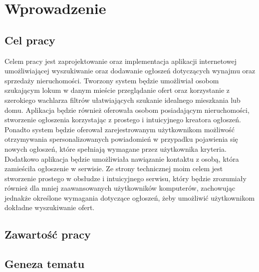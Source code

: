 \chapter{Wprowadzenie}
\label{cha:wprowadzenie}


\section{Cel pracy}
\label{sec:celPracy}
Celem pracy jest zaprojektowanie oraz implementacja aplikacji internetowej umożliwiającej wyszukiwanie oraz dodawanie ogłoszeń dotyczących wynajmu oraz sprzedaży nieruchomości. Tworzony system będzie umożliwiał osobom szukającym lokum w danym mieście przeglądanie ofert oraz korzystanie z szerokiego wachlarza filtrów ułatwiających szukanie idealnego mieszkania lub domu. Aplikacja będzie również oferowała osobom posiadającym nieruchomości, stworzenie ogłoszenia korzystając z prostego i intuicyjnego kreatora ogłoszeń. Ponadto system będzie oferował zarejestrowanym użytkownikom możliwość otrzymywania  spersonalizowanych powiadomień w przypadku pojawienia się nowych ogłoszeń, które spełniają wymagane przez użytkownika kryteria. Dodatkowo aplikacja będzie umożliwiała nawiązanie kontaktu z osobą, która zamieściła ogłoszenie w serwisie. Ze strony technicznej moim celem jest stworzenie prostego w obsłudze i intuicyjnego serwisu, który będzie zrozumiały również dla mniej zaawansowanych użytkowników komputerów, zachowując jednakże określone wymagania dotyczące ogłoszeń, żeby umożliwić użytkownikom dokładne wyszukiwanie ofert.


\section{Zawartość pracy}
\label{sec:zawartoscPracy}


\section{Geneza tematu}
\label{sec:genezaTematu}
